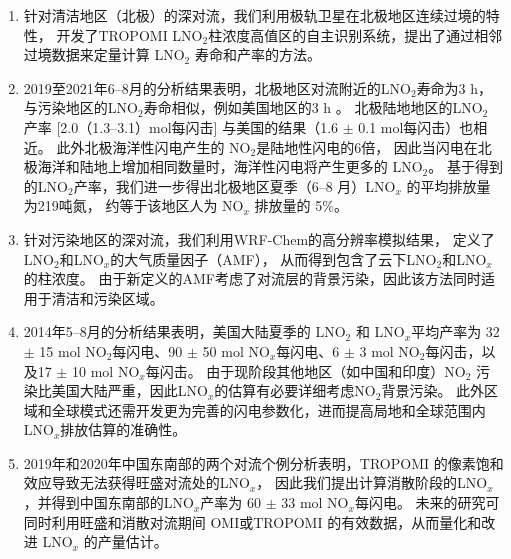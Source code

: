 \begin{enumerate}[label=（\arabic*）, labelindent=\parindent, nosep, leftmargin=0pt, widest=0, itemindent=*, topsep=0pt, partopsep=0pt, parsep=0pt]

\item 针对清洁地区（北极）的深对流，我们利用极轨卫星在北极地区连续过境的特性，
开发了TROPOMI LNO$_2$柱浓度高值区的自主识别系统，提出了通过相邻过境数据来定量计算 LNO$_2$ 寿命和产率的方法。

\item 2019至2021年6--8月的分析结果表明，北极地区对流附近的LNO$_2$寿命为3 h，
与污染地区的LNO$_2$寿命相似，例如美国地区的3 h \citep{Nault.2017}。
北极陆地地区的LNO$_2$ 产率 [2.0（1.3--3.1）mol每闪击] 与美国的结果（1.6 $\pm$ 0.1 mol每闪击）也相近\citep{Lapierre.2020}。
此外北极海洋性闪电产生的 NO$_2$是陆地性闪电的6倍，
因此当闪电在北极海洋和陆地上增加相同数量时，海洋性闪电将产生更多的 LNO$_2$。
基于得到的LNO$_2$产率，我们进一步得出北极地区夏季（6--8 月）LNO$_x$ 的平均排放量为219吨氮，
约等于该地区人为 NO$_x$ 排放量的 5\%。

\item 针对污染地区的深对流，我们利用WRF-Chem的高分辨率模拟结果，
定义了LNO$_2$和LNO$_x$的大气质量因子（AMF），
从而得到包含了云下LNO$_2$和LNO$_x$的柱浓度。
由于新定义的AMF考虑了对流层的背景污染，因此该方法同时适用于清洁和污染区域。

\item 2014年5--8月的分析结果表明，美国大陆夏季的 LNO$_2$ 和 LNO$_x$平均产率为
32 $\pm$ 15 mol NO$_2$每闪电、90 $\pm$ 50 mol NO$_x$每闪电、6 $\pm$ 3 mol NO$_2$每闪击，以及17 $\pm$ 10 mol NO$_x$每闪击。
由于现阶段其他地区（如中国和印度）NO$_2$ 污染比美国大陆严重，因此LNO$_x$的估算有必要详细考虑NO$_2$背景污染。
此外区域和全球模式还需开发更为完善的闪电参数化，进而提高局地和全球范围内LNO$_x$排放估算的准确性。

\item 2019年和2020年中国东南部的两个对流个例分析表明，TROPOMI 的像素饱和效应导致无法获得旺盛对流处的LNO$_x$，
因此我们提出计算消散阶段的LNO$_x$，并得到中国东南部的LNO$_x$产率为 60 $\pm$ 33 mol NO$_x$每闪电。
未来的研究可同时利用旺盛和消散对流期间 OMI或TROPOMI 的有效数据，从而量化和改进 LNO$_x$ 的产量估计。

\end{enumerate}
